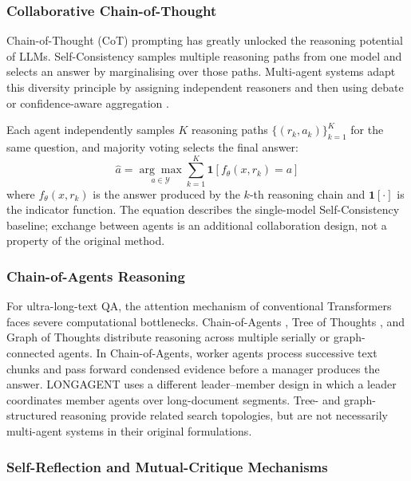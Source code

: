 \subsubsection{Collaborative Chain-of-Thought}
\label{sec:cot}

Chain-of-Thought (CoT) prompting \citep{wei2022chain_of_thought} has
greatly unlocked the reasoning potential of LLMs.
Self-Consistency \citep{wang2023self_consistency} samples multiple reasoning
paths from one model and selects an answer by marginalising over those paths.
Multi-agent systems adapt this diversity principle by assigning independent
reasoners and then using debate or confidence-aware aggregation
\citep{du2024multiagent_debate,chen2024reconcile}.

Each agent independently samples $K$ reasoning paths
$\{(r_k, a_k)\}_{k=1}^{K}$ for the same question, and majority voting
selects the final answer:
\begin{equation}
  \hat{a} = \underset{a\in\mathcal{Y}}{\arg\max}\sum_{k=1}^{K}
  \mathbf{1}\!\left[f_\theta(x,r_k)=a\right]
  \label{eq:self_consistency}
\end{equation}
where $f_\theta(x,r_k)$ is the answer produced by the $k$-th reasoning
chain and $\mathbf{1}[\cdot]$ is the indicator function.
The equation describes the single-model Self-Consistency baseline; exchange
between agents is an additional collaboration design, not a property of the
original method.

\subsubsection{Chain-of-Agents Reasoning}
\label{sec:chain_of_agents}

For ultra-long-text QA, the attention mechanism of conventional
Transformers faces severe computational bottlenecks.
Chain-of-Agents \citep{zhang2024chain_agents}, Tree of Thoughts
\citep{yao2023tree_of_thoughts}, and Graph of Thoughts
\citep{besta2024graph_of_thoughts} distribute reasoning across multiple
serially or graph-connected agents.
In Chain-of-Agents, worker agents process successive text chunks and pass
forward condensed evidence before a manager produces the answer. LONGAGENT
\citep{zhao2024longagent} uses a different leader--member design in which a
leader coordinates member agents over long-document segments. Tree- and
graph-structured reasoning provide related search topologies, but are not
necessarily multi-agent systems in their original formulations.

\subsubsection{Self-Reflection and Mutual-Critique Mechanisms}
\label{sec:reflexion}

